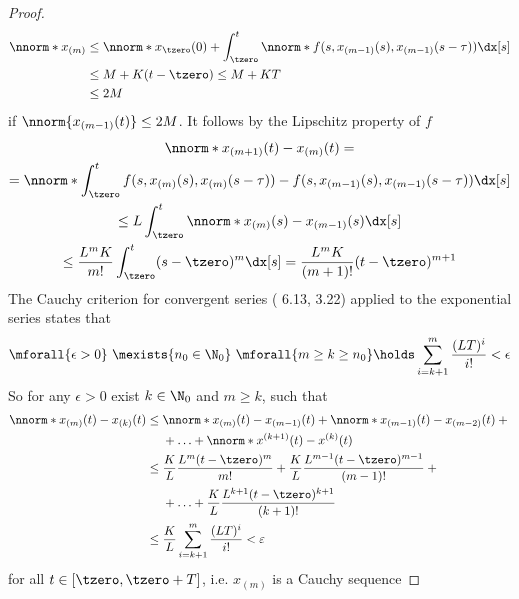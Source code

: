 \begin{proof}
\begin{align}
            \nnorm*{x_{(m)}} &\leq \nnorm*{x_\tzero(0)} + \int_\tzero^t \nnorm*{f(s,x_{(m-1)}(s),x_{(m-1)}(s-\tau))}\dx[s]\\
            &\leq M + K(t-\tzero) \leq M+KT\\
            &\leq 2M
        \end{align}
        if $\nnorm{x_{(m-1)}(t)}\leq 2M$.
        It follows by the Lipschitz property of $f$
        \begin{multline*}
            \nnorm*{x_{(m+1)}(t)-x_{(m)}(t)}=\\
            = \nnorm*{\int_\tzero^t f(s,x_{(m)}(s),x_{(m)}(s-\tau)) - f(s,x_{(m-1)}(s),x_{(m-1)}(s-\tau))\dx[s]}\\
            \leq L \int_\tzero^t \nnorm*{x_{(m)}(s) - x_{(m-1)}(s)}\dx[s]\\
            \leq \frac{L^m K}{m!} \int_\tzero^t (s-\tzero)^m\dx[s]
            = \frac{L^m K}{(m+1)!}(t-\tzero)^{m+1}
        \end{multline*}
        The Cauchy criterion for convergent series (\cite{Gathmann12GDM} 6.13, \cite{Rudin76PrinciplesAnalysis} 3.22) applied to the exponential series states that
        \begin{equation*}
            \mforall{\epsilon>0}\ \mexists{n_0\in\N_0}\ \mforall{m\geq k\geq n_0}\holds \sum_{i=k+1}^m \frac{(LT)^i}{i!} <\epsilon
        \end{equation*}
        So for any $\epsilon>0$ exist $k\in\N_0$ and $m\geq k$, such that
        \begin{align*}
            \nnorm*{x_{(m)}(t)-x_{(k)}(t)} \leq{} & \nnorm*{x_{(m)}(t)-x_{(m-1)}(t)} + \nnorm*{x_{(m-1)}(t)-x_{(m-2)}(t)} + {}\\
            & + \ldots + \nnorm*{x^{(k+1)}(t)-x^{(k)}(t)}\\
            \leq{} & \frac{K}{L}\frac{L^m (t-\tzero)^m}{m!} + \frac{K}{L}\frac{L^{m-1} (t-\tzero)^{m-1}}{(m-1)!} + {}\\
            & + \ldots +\frac{K}{L}\frac{L^{k+1} (t-\tzero)^{k+1}}{(k+1)!}\\
            \leq{} & \frac{K}{L}\sum_{i=k+1}^m \frac{(LT)^i}{i!} < \varepsilon
        \end{align*}
        for all $t\in [\tzero,\tzero+T]$, i.e. $x_{(m)}$ is a Cauchy sequence

    


\end{proof}
